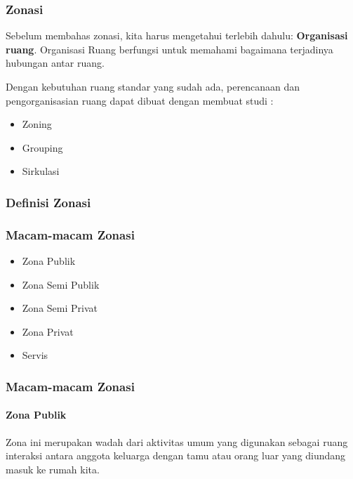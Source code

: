 \documentclass[../spa_2.tex]{subfiles}
\begin{document}
\begin{frame}[mytitle=standard,c,mycolor=digiPH_uniblue,light]
	\frametitle{Zonasi}

	Sebelum membahas zonasi, kita harus mengetahui terlebih dahulu: \textbf{Organisasi ruang}. Organisasi Ruang berfungsi untuk memahami bagaimana terjadinya hubungan antar ruang.

	Dengan kebutuhan ruang standar yang sudah ada, perencanaan dan pengorganisasian ruang dapat dibuat dengan membuat studi :

	\begin{itemize}
		\item Zoning
		\item  Grouping
		\item  Sirkulasi
	\end{itemize}\end{frame}



\begin{frame}[mytitle=standard,c,mybg=bglight3,light]
	\frametitle{Definisi Zonasi}

\end{frame}

\begin{frame}[mytitle=standard,c,mycolor=digiPH_gray,light]
	\frametitle{Macam-macam Zonasi}

	\begin{itemize}
		\item Zona Publik
		\item Zona Semi Publik
		\item Zona Semi Privat
		\item Zona Privat
		\item Servis
	\end{itemize}
\end{frame}



\begin{frame}[mytitle=standard,t,mycolor=digiPH_uniblue,light]
	\frametitle{Macam-macam Zonasi}
	\framesubtitle{Zona Publik}
	Zona ini merupakan wadah dari aktivitas umum yang digunakan sebagai ruang interaksi antara anggota keluarga dengan tamu atau orang luar yang diundang masuk ke rumah kita.

\end{frame}
\end{document}
